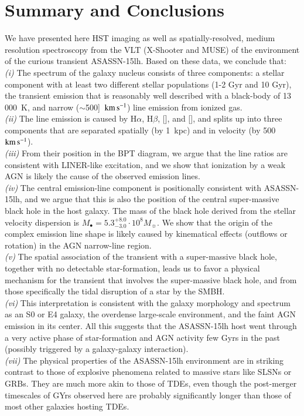 \documentclass[traditabstract]{aa}
\newcommand{\kms}{$\rm{km\,s^{-1}}$}
\newcommand{\hb}{H$\beta$}
\newcommand{\ha}{H$\alpha$}
\newcommand{\oiii}{[\ion{O}{iii}]}
\newcommand{\nii}{[\ion{N}{ii}]}
\begin{document}
\section{Summary and Conclusions}

We have presented here HST imaging as well as spatially-resolved, medium resolution spectroscopy from the VLT (X-Shooter and MUSE) of the environment of the curious transient ASASSN-15lh. Based on these data, we conclude that:\\
\emph{(i)} The spectrum of the galaxy nucleus consists of three components: a stellar component with at least two different stellar populations (1-2 Gyr and 10 Gyr), the transient emission that is reasonably well described with a black-body of 13\,000~K, and narrow ($\sim$500]~\kms) line emission from ionized gas.\\
\textit{(ii)} The line emission is caused by \ha, \hb, \nii, and \oiii, and splits up into three components that are separated spatially (by 1~kpc) and in velocity (by 500~\kms). \\
\textit{(iii)} From their position in the BPT diagram, we argue that the line ratios are consistent with LINER-like excitation, and we show that ionization by a weak AGN is likely the cause of the observed emission lines.\\
\textit{(iv)} The central emission-line component is positionally consistent with ASASSN-15lh, and we argue that this is also the position of the central super-massive black hole in the host galaxy. The mass of the black hole derived from the stellar velocity dispersion is $M_\bullet = 5.3_{-3.0}^{+8.0}\cdot10^{8} M_\sun$. We show that the origin of the complex emission line shape is likely caused by kinematical effects (outflows or rotation) in the AGN narrow-line region.\\
\textit{(v)} The spatial association of the transient with a super-massive black hole, together with no detectable star-formation, leads us to favor a physical mechanism for the transient that involves the super-massive black hole, and from those specifically the tidal disruption of a star by the SMBH.\\
\textit{(vi)} This interpretation is consistent with the galaxy morphology and spectrum as an S0 or E4 galaxy, the overdense large-scale environment, and the faint AGN emission in its center. All this suggests that the ASASSN-15lh host went through a very active phase of star-formation and AGN activity few Gyrs in the past (possibly triggered by a galaxy-galaxy interaction). \\
\textit{(vii)} The physical properties of the ASASSN-15lh environment are in striking contrast to those of explosive phenomena related to massive stars like SLSNs or GRBs. They are much more akin to those of TDEs, even though the post-merger timescales of GYrs observed here are probably significantly longer than those of most other galaxies hosting TDEs.
\end{document}
